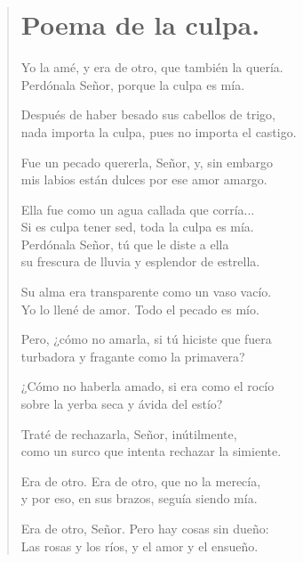 \documentclass[11pt, portrait, twoside, notitlepage, openright]{book}
\begin{document}
\newpage
\begin{verse}
\begin{center}
\section{Poema de la culpa.}
\end{center}
Yo la amé, y era de otro, que también la quería.\\
Perdónala Señor, porque la culpa es mía.
\newline

Después de haber besado sus cabellos de trigo,\\
nada importa la culpa, pues no importa el castigo.
\newline

Fue un pecado quererla, Señor, y, sin embargo\\
mis labios están dulces por ese amor amargo.
\newline

Ella fue como un agua callada que corría...\\
Si es culpa tener sed, toda la culpa es mía.\\
Perdónala Señor, tú que le diste a ella\\
su frescura de lluvia y esplendor de estrella.
\newline

Su alma era transparente como un vaso vacío.\\
Yo lo llené de amor. Todo el pecado es mío.
\newline

Pero, ¿cómo no amarla, si tú hiciste que fuera\\
turbadora y fragante como la primavera?
\newline

¿Cómo no haberla amado, si era como el rocío\\
sobre la yerba seca y ávida del estío?

Traté de rechazarla, Señor, inútilmente,\\
como un surco que intenta rechazar la simiente.
\newline

Era de otro. Era de otro, que no la merecía,\\
y por eso, en sus brazos, seguía siendo mía.
\newline

Era de otro, Señor. Pero hay cosas sin dueño:\\
Las rosas y los ríos, y el amor y el ensueño.
\newline


\end{verse}
\end{document}
